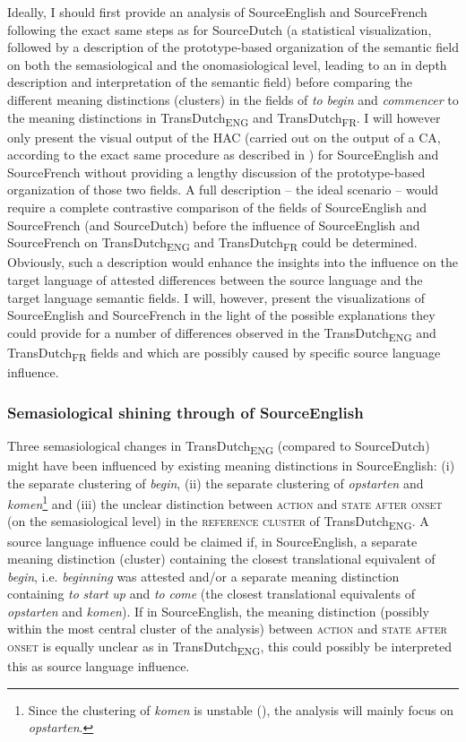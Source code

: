Ideally, I should first provide an analysis of SourceEnglish and SourceFrench following the exact same steps as for SourceDutch (a statistical visualization, followed by a description of the prototype-based organization of the semantic field on both the semasiological and the onomasiological level, leading to an in depth description and interpretation of the semantic field) before comparing the different meaning distinctions (clusters) in the fields of \textit{to} \textit{begin} and \textit{commencer} to the meaning distinctions in TransDutch\textsubscript{ENG} and TransDutch\textsubscript{FR}. I will however only present the visual output of the HAC (carried out on the output of a CA, according to the exact same procedure as described in ) for SourceEnglish and SourceFrench without providing a lengthy discussion of the prototype-based organization of those two fields. A full description – the ideal scenario – would require a complete contrastive comparison of the fields of SourceEnglish and SourceFrench (and SourceDutch) before the influence of SourceEnglish and SourceFrench on TransDutch\textsubscript{ENG} and TransDutch\textsubscript{FR} could be determined. Obviously, such a description would enhance the insights into the influence on the target language of attested differences between the source language and the target language semantic fields. I will, however, present the visualizations of SourceEnglish and SourceFrench in the light of the possible explanations they could provide for a number of differences observed in the TransDutch\textsubscript{ENG} and TransDutch\textsubscript{FR} fields and which are possibly caused by specific source language influence.

\subsubsection{Semasiological shining through of SourceEnglish}
\label{sec:4.6.1.1}  
Three semasiological changes in TransDutch\textsubscript{ENG} (compared to SourceDutch) might have been influenced by existing meaning distinctions in SourceEnglish: (i) the separate clustering of \textit{begin}, (ii) the separate clustering of \textit{opstarten} and \textit{komen}\footnote{Since the clustering of \textit{komen} is unstable (), the analysis will mainly focus on \textit{opstarten}.} and (iii) the unclear distinction between \textsc{action} and \textsc{state after onset} (on the semasiological level) in the \textsc{reference cluster} of TransDutch\textsubscript{ENG}. A source language influence could be claimed if, in SourceEnglish, a separate meaning distinction (cluster) containing the closest translational equivalent of \textit{begin}, i.e. \textit{beginning} was attested and\slash or a separate meaning distinction containing \textit{to} \textit{start} \textit{up} and \textit{to} \textit{come} (the closest translational equivalents of \textit{opstarten} and \textit{komen}). If in SourceEnglish, the meaning distinction (possibly within the most central cluster of the analysis) between \textsc{action} and \textsc{state after onset} is equally unclear as in TransDutch\textsubscript{ENG}, this could possibly be interpreted this as source language influence.

